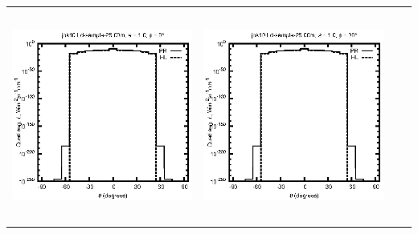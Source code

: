 \begin{tabular}{c c c c}
\includegraphics[height=7cm]{../eps/jok10_Ld_sample_25.00m_fwd.eps} &
\includegraphics[height=7cm]{../eps/jok10_Ld_sample_25.00m_cross.eps} \\
\end{tabular}

\pagebreak

